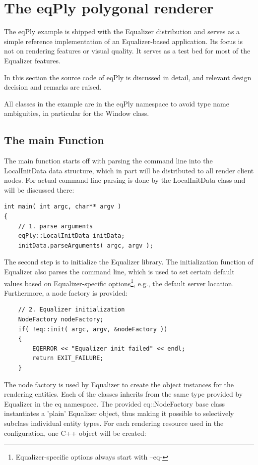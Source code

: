 \documentclass[10pt,a4]{scrartcl}
\begin{document}
\section{The \textsf{eqPly} polygonal renderer}

The \textsf{eqPly} example is shipped with the Equalizer distribution
and serves as a simple reference implementation of an Equalizer-based
application. Its focus is not on rendering features or visual quality.
It serves as a test bed for most of the Equalizer features.

In this section the source code of \textsf{eqPly} is discussed in
detail, and relevant design decision and remarks are raised.

All classes in the example are in the \textsf{eqPly} namespace to avoid
type name ambiguities, in particular for the \textsf{Window} class.

\subsection{The main Function}

The main function starts off with parsing the command line into the
\textsf{LocalInitData} data structure, which in part will be distributed
to all render client nodes. For actual command line parsing is done by
the \textsf{LocalInitData} class and will be discussed there:

{\small\begin{lstlisting}
int main( int argc, char** argv )
{
    // 1. parse arguments
    eqPly::LocalInitData initData;
    initData.parseArguments( argc, argv );
\end{lstlisting}}

The second step is to initialize the Equalizer library. The
initialization function of Equalizer also parses the command line, which
is used to set certain default values based on Equalizer-specific
options\footnote{Equalizer-specific options always start with --eq-},
e.g., the default server location. Furthermore, a node factory is
provided:

{\small\begin{lstlisting}
    // 2. Equalizer initialization
    NodeFactory nodeFactory;
    if( !eq::init( argc, argv, &nodeFactory ))
    {
        EQERROR << "Equalizer init failed" << endl;
        return EXIT_FAILURE;
    }
\end{lstlisting}}

The node factory is used by Equalizer to create the object instances for
the rendering entities. Each of the classes inherits from the same type
provided by Equalizer in the \textsf{eq} namespace. The provided
\textsf{eq::NodeFactory} base class instantiates a 'plain' Equalizer
object, thus making it possible to selectively subclass individual
entity types. For each rendering resource used in the configuration, one
C++ object will be created:
\end{document}
